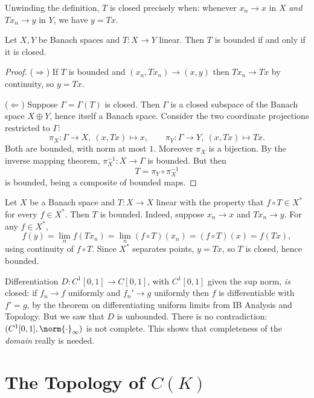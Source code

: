 Unwinding the definition, $T$ is closed precisely when: whenever $x_n \to x$ in $X$ \emph{and} $Tx_n \to y$ in $Y$, we have $y = Tx$.

\begin{theorem}
	Let $X, Y$ be Banach spaces and $T : X \to Y$ linear. Then $T$ is bounded if and only if it is closed.
\end{theorem}

\begin{proof}
	($\Rightarrow$) If $T$ is bounded and $(x_n, Tx_n) \to (x,y)$ then $Tx_n \to Tx$ by continuity, so $y = Tx$.

	($\Leftarrow$) Suppose $\Gamma = \Gamma(T)$ is closed. Then $\Gamma$ is a closed subspace of the Banach space $X \oplus Y$, hence itself a Banach space. Consider the two coordinate projections restricted to $\Gamma$:
	$$\pi_X : \Gamma \to X, \ (x,Tx)\mapsto x, \qquad \pi_Y : \Gamma \to Y, \ (x,Tx) \mapsto Tx.$$
	Both are bounded, with norm at most $1$. Moreover $\pi_X$ is a bijection. By the inverse mapping theorem, $\pi_X^{-1} : X \to \Gamma$ is bounded. But then
	$$T = \pi_Y \circ \pi_X^{-1}$$
	is bounded, being a composite of bounded maps.
\end{proof}

\begin{example}
	Let $X$ be a Banach space and $T : X \to X$ linear with the property that $f \circ T \in X^*$ for every $f \in X^*$. Then $T$ is bounded. Indeed, suppose $x_n \to x$ and $Tx_n \to y$. For any $f \in X^*$,
	$$f(y) = \lim_n f(Tx_n) = \lim_n (f\circ T)(x_n) = (f \circ T)(x) = f(Tx),$$
	using continuity of $f \circ T$. Since $X^*$ separates points, $y = Tx$, so $T$ is closed, hence bounded.
\end{example}

\begin{example}
	Differentiation $D : C^1[0,1] \to C[0,1]$, with $C^1[0,1]$ given the sup norm, \emph{is} closed: if $f_n \to f$ uniformly and $f_n' \to g$ uniformly then $f$ is differentiable with $f' = g$, by the theorem on differentiating uniform limits from IB Analysis and Topology. But we saw that $D$ is unbounded. There is no contradiction: $(C^1[0,1], \norm{\cdot}_\infty)$ is not complete. This shows that completeness of the \emph{domain} really is needed.
\end{example}

\section{The Topology of $C(K)$}

